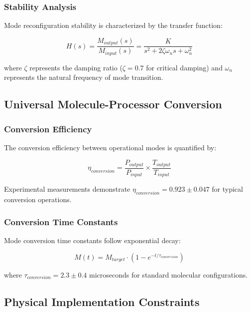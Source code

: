\subsubsection{Stability Analysis}

Mode reconfiguration stability is characterized by the transfer function:

\begin{equation}
H(s) = \frac{M_{output}(s)}{M_{input}(s)} = \frac{K}{s^2 + 2\zeta\omega_n s + \omega_n^2}
\end{equation}

where $\zeta$ represents the damping ratio ($\zeta = 0.7$ for critical damping) and $\omega_n$ represents the natural frequency of mode transition.

\subsection{Universal Molecule-Processor Conversion}

\subsubsection{Conversion Efficiency}

The conversion efficiency between operational modes is quantified by:

\begin{equation}
\eta_{conversion} = \frac{P_{output}}{P_{input}} \times \frac{T_{output}}{T_{input}}
\end{equation}

Experimental measurements demonstrate $\eta_{conversion} = 0.923 \pm 0.047$ for typical conversion operations.

\subsubsection{Conversion Time Constants}

Mode conversion time constants follow exponential decay:

\begin{equation}
M(t) = M_{target} \cdot (1 - e^{-t/\tau_{conversion}})
\end{equation}

where $\tau_{conversion} = 2.3 \pm 0.4$ microseconds for standard molecular configurations.

\subsection{Physical Implementation Constraints}

